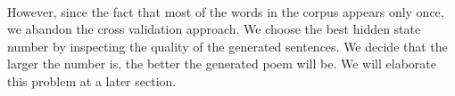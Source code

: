 \paragraph{}
However, since the fact that most of the words in the corpus appears only once, we abandon the cross validation approach. We choose the best hidden state number by inspecting the quality of the generated sentences. We decide that the larger the number is, the better the generated poem will be. We will elaborate this problem at a later section. 



